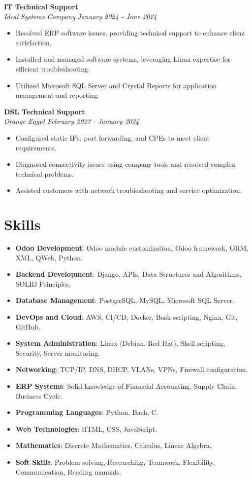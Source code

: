 \documentclass[letterpaper, 10pt]{article}
\begin{document}
\noindent\textbf{IT Technical Support}\\
\textit{Ideal Systems Company} \hfill \textit{January 2024 - June 2024}
\begin{itemize}[leftmargin=*]
    \item Resolved ERP software issues, providing technical support to enhance client satisfaction.
    \item Installed and managed software systems, leveraging Linux expertise for efficient troubleshooting.
    \item Utilized Microsoft SQL Server and Crystal Reports for application management and reporting.
\end{itemize}

\noindent\textbf{DSL Technical Support}\\
\textit{Orange Egypt} \hfill \textit{February 2023 - January 2024}
\begin{itemize}[leftmargin=*]
    \item Configured static IPs, port forwarding, and CPEs to meet client requirements.
    \item Diagnosed connectivity issues using company tools and resolved complex technical problems.
    \item Assisted customers with network troubleshooting and service optimization.
\end{itemize}
\newpage

\section*{Skills}
\begin{itemize}[leftmargin=*]
    \item \textbf{Odoo Development}: Odoo module customization, Odoo framework, ORM, XML, QWeb, Python.
    \item \textbf{Backend Development}: Django, APIs, Data Structures and Algorithms, SOLID Principles.
    \item \textbf{Database Management}: PostgreSQL, MySQL, Microsoft SQL Server.
    \item \textbf{DevOps and Cloud}: AWS, CI/CD, Docker, Bash scripting, Nginx, Git, GitHub.
    \item \textbf{System Administration}: Linux (Debian, Red Hat), Shell scripting, Security, Server monitoring.
    \item \textbf{Networking}: TCP/IP, DNS, DHCP, VLANs, VPNs, Firewall configuration.
    \item \textbf{ERP Systems}: Solid knowledge of Financial Accounting, Supply Chain, Business Cycle.
    \item \textbf{Programming Languages}: Python, Bash, C.
    \item \textbf{Web Technologies}: HTML, CSS, JavaScript.
    \item \textbf{Mathematics}: Discrete Mathematics, Calculus, Linear Algebra.
    \item \textbf{Soft Skills}: Problem-solving, Researching, Teamwork, Flexibility, Communication, Reading manuals.
\end{itemize}
\end{document}
